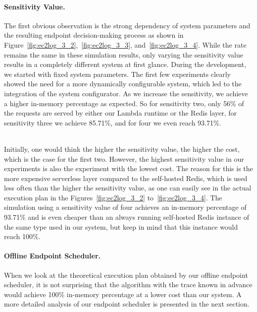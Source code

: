 \paragraph{Sensitivity Value.}
The first obvious observation is the strong dependency of system parameters and the resulting endpoint decision-making process as shown in Figure~\ref{fig:ec2log_3_2},~\ref{fig:ec2log_3_3}, and~\ref{fig:ec2log_3_4}. While the rate remains the same in these simulation results, only varying the sensitivity value results in a completely different system at first glance. During the development, we started with fixed system parameters. The first few experiments clearly showed the need for a more dynamically configurable system, which led to the integration of the system configurator. As we increase the sensitivity, we achieve a higher in-memory percentage as expected. So for sensitivity two, only 56\% of the requests are served by either our Lambda runtime or the Redis layer, for sensitivity three we achieve 85.71\%, and for four we even reach 93.71\%. 

~\\
Initially, one would think the higher the sensitivity value, the higher the cost, which is the case for the first two. However, the highest sensitivity value in our experiments is also the experiment with the lowest cost. The reason for this is the more expensive serverless layer compared to the self-hosted Redis, which is used less often than the higher the sensitivity value, as one can easily see in the actual execution plan in the Figures~\ref{fig:ec2log_3_2} to~\ref{fig:ec2log_3_4}. The simulation using a sensitivity value of four achieves an in-memory percentage of 93.71\% and is even cheaper than an always running self-hosted Redis instance of the same type used in our system, but keep in mind that this instance would reach 100\%. 

\paragraph{Offline Endpoint Scheduler.}
When we look at the theoretical execution plan obtained by our offline endpoint scheduler, it is not surprising that the algorithm with the trace known in advance would achieve 100\% in-memory percentage at a lower cost than our system. A more detailed analysis of our endpoint scheduler is presented in the next section. 

